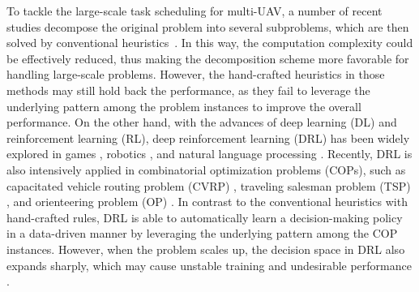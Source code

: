 \documentclass[lettersize,journal]{IEEEtran}
\begin{document}
	To tackle the large-scale task scheduling for multi-UAV, a number of recent studies decompose the original problem into several subproblems, which are then solved by conventional heuristics~\cite{liuIterativeTwophaseOptimization2021, zitouniDistributedSolutionMultirobot2021}. In this way, the computation complexity could be effectively reduced, thus making the decomposition scheme more favorable for handling large-scale problems. However, the hand-crafted heuristics in those methods may still hold back the performance, as they fail to leverage the underlying pattern among the problem instances to improve the overall performance. On the other hand, with the advances of deep learning (DL) and reinforcement learning (RL), deep reinforcement learning (DRL) has been widely explored in games \cite{mnihHumanlevelControlDeep2015a, zhuOnlineMinimaxNetwork2022}, robotics \cite{zhaoSimtoRealTransferDeep2020}, and natural language processing \cite{luketinaSurveyReinforcementLearning2019}. Recently, DRL is also intensively applied in combinatorial optimization problems (COPs), such as capacitated vehicle routing problem (CVRP) \cite{luLearningbasedIterativeMethod2019}, traveling salesman problem (TSP) \cite{zhengCombiningReinforcementLearning2021}, and orienteering problem (OP) \cite{gamaReinforcementLearningApproach2021a}. In contrast to the conventional heuristics with hand-crafted rules, DRL is able to automatically learn a decision-making policy in a data-driven manner by leveraging the underlying pattern among the COP instances. However, when the problem scales up, the decision space in DRL also expands sharply, which may cause unstable training and undesirable performance \cite{maHierarchicalReinforcementLearning2021}.
	
\end{document}

